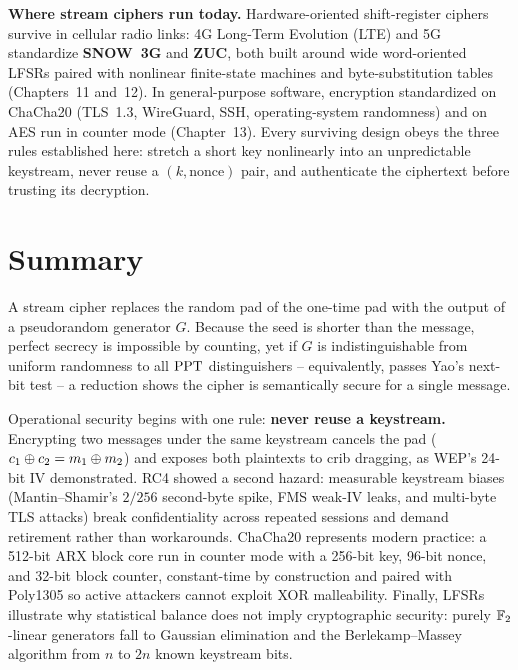 \begin{applicationbox}
\label{ch10:app-streams}
\textbf{Where stream ciphers run today.} Hardware-oriented shift-register ciphers survive in cellular radio links: 4G Long-Term Evolution (LTE) and 5G standardize \textbf{SNOW~3G} and \textbf{ZUC}, both built around wide word-oriented LFSRs paired with nonlinear finite-state machines and byte-substitution tables (Chapters~11 and~12). In general-purpose software, encryption standardized on ChaCha20 (TLS~1.3, WireGuard, SSH, operating-system randomness) and on AES run in counter mode (Chapter~13). Every surviving design obeys the three rules established here: stretch a short key nonlinearly into an unpredictable keystream, never reuse a $(k, \text{nonce})$ pair, and authenticate the ciphertext before trusting its decryption.
\end{applicationbox}

\section{Summary}
\label{ch10:summary}

A stream cipher replaces the random pad of the one-time pad with the output of a pseudorandom generator $G$. Because the seed is shorter than the message, perfect secrecy is impossible by counting, yet if $G$ is indistinguishable from uniform randomness to all $\mathrm{PPT}$ distinguishers -- equivalently, passes Yao's next-bit test -- a reduction shows the cipher is semantically secure for a single message.

Operational security begins with one rule: \textbf{never reuse a keystream.} Encrypting two messages under the same keystream cancels the pad ($c_1 \oplus c_2 = m_1 \oplus m_2$) and exposes both plaintexts to crib dragging, as WEP's 24-bit IV demonstrated. RC4 showed a second hazard: measurable keystream biases (Mantin--Shamir's $2/256$ second-byte spike, FMS weak-IV leaks, and multi-byte TLS attacks) break confidentiality across repeated sessions and demand retirement rather than workarounds. ChaCha20 represents modern practice: a 512-bit ARX block core run in counter mode with a 256-bit key, 96-bit nonce, and 32-bit block counter, constant-time by construction and paired with Poly1305 so active attackers cannot exploit XOR malleability. Finally, LFSRs illustrate why statistical balance does not imply cryptographic security: purely $\mathbb{F}_2$-linear generators fall to Gaussian elimination and the Berlekamp--Massey algorithm from $n$ to $2n$ known keystream bits.

